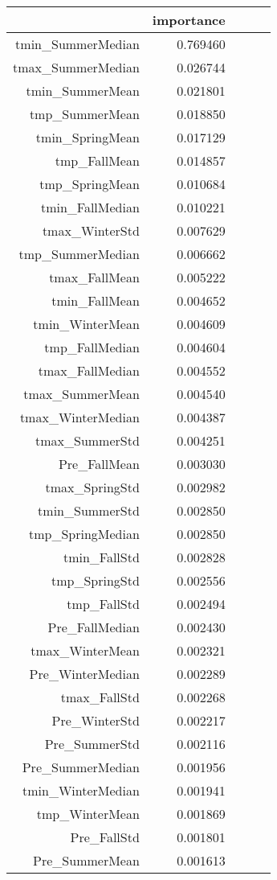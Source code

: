 \begin{tabular}{rrrrr}
\toprule
 & importance \\
\midrule
tmin_SummerMedian & 0.769460 \\
tmax_SummerMedian & 0.026744 \\
tmin_SummerMean & 0.021801 \\
tmp_SummerMean & 0.018850 \\
tmin_SpringMean & 0.017129 \\
tmp_FallMean & 0.014857 \\
tmp_SpringMean & 0.010684 \\
tmin_FallMedian & 0.010221 \\
tmax_WinterStd & 0.007629 \\
tmp_SummerMedian & 0.006662 \\
tmax_FallMean & 0.005222 \\
tmin_FallMean & 0.004652 \\
tmin_WinterMean & 0.004609 \\
tmp_FallMedian & 0.004604 \\
tmax_FallMedian & 0.004552 \\
tmax_SummerMean & 0.004540 \\
tmax_WinterMedian & 0.004387 \\
tmax_SummerStd & 0.004251 \\
Pre_FallMean & 0.003030 \\
tmax_SpringStd & 0.002982 \\
tmin_SummerStd & 0.002850 \\
tmp_SpringMedian & 0.002850 \\
tmin_FallStd & 0.002828 \\
tmp_SpringStd & 0.002556 \\
tmp_FallStd & 0.002494 \\
Pre_FallMedian & 0.002430 \\
tmax_WinterMean & 0.002321 \\
Pre_WinterMedian & 0.002289 \\
tmax_FallStd & 0.002268 \\
Pre_WinterStd & 0.002217 \\
Pre_SummerStd & 0.002116 \\
Pre_SummerMedian & 0.001956 \\
tmin_WinterMedian & 0.001941 \\
tmp_WinterMean & 0.001869 \\
Pre_FallStd & 0.001801 \\
Pre_SummerMean & 0.001613 \\

\end{tabular}
